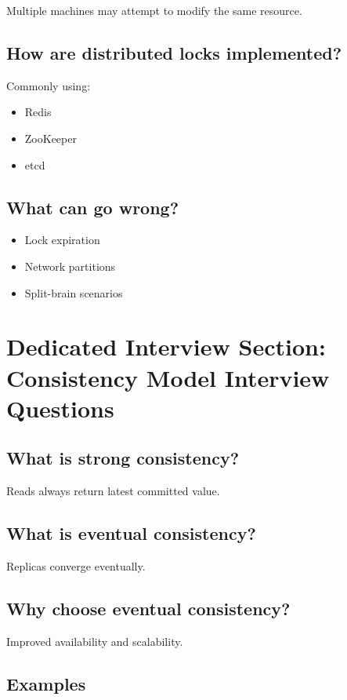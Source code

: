 Multiple machines may attempt to modify the same resource.

\subsection*{How are distributed locks implemented?}

Commonly using:

\begin{itemize}
\item Redis
\item ZooKeeper
\item etcd
\end{itemize}

\subsection*{What can go wrong?}

\begin{itemize}
\item Lock expiration
\item Network partitions
\item Split-brain scenarios
\end{itemize}

\section{Dedicated Interview Section: Consistency Model Interview Questions}

\subsection*{What is strong consistency?}

Reads always return latest committed value.

\subsection*{What is eventual consistency?}

Replicas converge eventually.

\subsection*{Why choose eventual consistency?}

Improved availability and scalability.

\subsection*{Examples}


